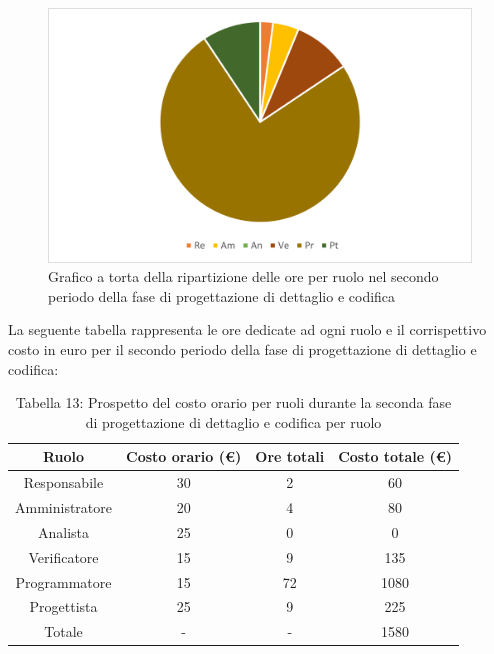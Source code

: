 \begin{figure}[H]
    \centering
    \includegraphics[scale=0.6]{img/grafi preventivo/torta/codifica/periodo2.png}
    \caption{Grafico a torta della ripartizione delle ore per ruolo nel secondo periodo della fase di progettazione di dettaglio e codifica}
\end{figure}
La seguente tabella rappresenta le ore dedicate ad ogni ruolo e il corrispettivo costo in euro per il secondo periodo della fase di progettazione di dettaglio e codifica:
\begin{table}[h]
	\setlength\extrarowheight{5pt}
	\centering
	\begin{tabularx}{\textwidth}{|ccc|c|}
		\hline
		\rowcolor{white}
		\textbf{Ruolo} & \textbf{Costo orario (€)} & \textbf{Ore totali} & \textbf{Costo totale (€)} \\
		\hline
		Responsabile &30&2&60 \\
		Amministratore &20&4&80 \\
		Analista &25&0&0 \\
		Verificatore &15&9&135 \\
		Programmatore &15&72&1080 \\
		Progettista &25&9&225 \\
		\hline
		Totale &-&-&1580 \\
		\hline
	\end{tabularx}
    \vspace{10pt}
	\caption{Tabella 13: Prospetto del costo orario per ruoli durante la seconda fase di progettazione di dettaglio e codifica per ruolo}
\end{table}
%
